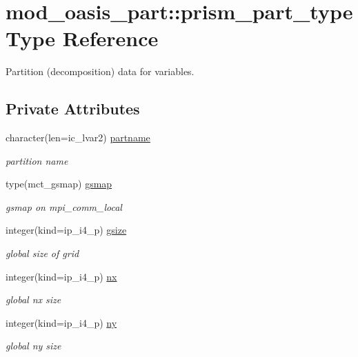 \hypertarget{structmod__oasis__part_1_1prism__part__type}{\section{mod\+\_\+oasis\+\_\+part\+:\+:prism\+\_\+part\+\_\+type Type Reference}
\label{structmod__oasis__part_1_1prism__part__type}
}


Partition (decomposition) data for variables.  


\subsection*{Private Attributes}
\begin{DoxyCompactItemize}
\item 
character(len=ic\+\_\+lvar2) \hyperlink{structmod__oasis__part_1_1prism__part__type_ae53180c23d73bf1f4930e24171dba0a2}{partname}
\begin{DoxyCompactList}\small\item\em partition name \end{DoxyCompactList}\item 
type(mct\+\_\+gsmap) \hyperlink{structmod__oasis__part_1_1prism__part__type_a3d605216cf9bdf556416419ee8ec5993}{gsmap}
\begin{DoxyCompactList}\small\item\em gsmap on mpi\+\_\+comm\+\_\+local \end{DoxyCompactList}\item 
integer(kind=ip\+\_\+i4\+\_\+p) \hyperlink{structmod__oasis__part_1_1prism__part__type_aaa2c19e53815eaf5df431612eadabfa4}{gsize}
\begin{DoxyCompactList}\small\item\em global size of grid \end{DoxyCompactList}\item 
integer(kind=ip\+\_\+i4\+\_\+p) \hyperlink{structmod__oasis__part_1_1prism__part__type_a7640ce8e1943f2fc70c8b072795502b2}{nx}
\begin{DoxyCompactList}\small\item\em global nx size \end{DoxyCompactList}\item 
integer(kind=ip\+\_\+i4\+\_\+p) \hyperlink{structmod__oasis__part_1_1prism__part__type_a4169783dee96aa9c60d43826daf6000c}{ny}
\begin{DoxyCompactList}\small\item\em global ny size \end{DoxyCompactList}\item 

\end{DoxyCompactItemize}
